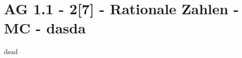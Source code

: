 \section{AG 1.1 - 2[7] - Rationale Zahlen - MC - dasda}

\begin{beispiel}[AG 1.1]{1}
dsad
\end{beispiel}
